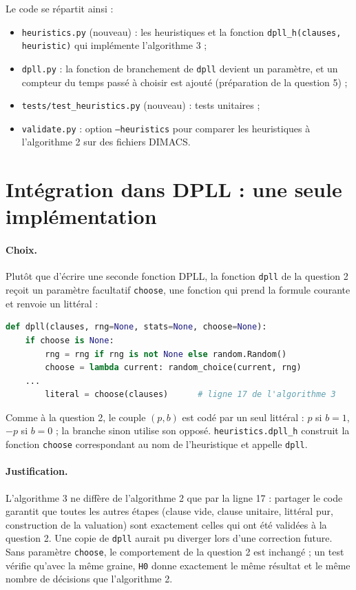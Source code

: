 \documentclass[11pt,a4paper]{article}
\begin{document}
Le code se répartit ainsi :
\begin{itemize}
  \item \texttt{heuristics.py} (nouveau) : les heuristiques et la fonction
    \texttt{dpll\_h(clauses, heuristic)} qui implémente l'algorithme 3 ;
  \item \texttt{dpll.py} : la fonction de branchement de \texttt{dpll}
    devient un paramètre, et un compteur du temps passé à choisir est ajouté
    (préparation de la question 5) ;
  \item \texttt{tests/test\_heuristics.py} (nouveau) : tests unitaires ;
  \item \texttt{validate.py} : option \texttt{--heuristics} pour comparer
    les heuristiques à l'algorithme 2 sur des fichiers DIMACS.
\end{itemize}

\section{Intégration dans DPLL : une seule implémentation}
\label{sec:integration}

\paragraph{Choix.} Plutôt que d'écrire une seconde fonction DPLL, la
fonction \texttt{dpll} de la question 2 reçoit un paramètre facultatif
\texttt{choose}, une fonction qui prend la formule courante et renvoie un
littéral :
\begin{lstlisting}[language=Python]
def dpll(clauses, rng=None, stats=None, choose=None):
    if choose is None:
        rng = rng if rng is not None else random.Random()
        choose = lambda current: random_choice(current, rng)
    ...
        literal = choose(clauses)      # ligne 17 de l'algorithme 3
\end{lstlisting}
Comme à la question 2, le couple $(p, b)$ est codé par un seul littéral :
$p$ si $b = 1$, $-p$ si $b = 0$ ; la branche \og sinon \fg{} utilise son
opposé. \texttt{heuristics.dpll\_h} construit la fonction \texttt{choose}
correspondant au nom de l'heuristique et appelle \texttt{dpll}.

\paragraph{Justification.} L'algorithme 3 ne diffère de l'algorithme 2 que
par la ligne 17 : partager le code garantit que toutes les autres étapes
(clause vide, clause unitaire, littéral pur, construction de la valuation)
sont exactement celles qui ont été validées à la question 2. Une copie de
\texttt{dpll} aurait pu diverger lors d'une correction future. Sans
paramètre \texttt{choose}, le comportement de la question 2 est inchangé ;
un test vérifie qu'avec la même graine, \texttt{H0} donne exactement le même
résultat et le même nombre de décisions que l'algorithme 2.
\end{document}
